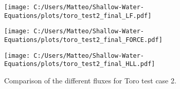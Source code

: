 \begin{figure}[H]
    \centering
    \begin{minipage}{0.45\textwidth}
        \centering
        \texttt{[image: C:/Users/Matteo/Shallow-Water-Equations/plots/toro\_test2\_final\_LF.pdf]}
    \end{minipage}%
    \hfill
    \begin{minipage}{0.45\textwidth}
        \centering
        \texttt{[image: C:/Users/Matteo/Shallow-Water-Equations/plots/toro\_test2\_final\_FORCE.pdf]}
    \end{minipage}
    
    \vspace{0.5cm} %
    \begin{minipage}{0.45\textwidth}
        \centering
        \texttt{[image: C:/Users/Matteo/Shallow-Water-Equations/plots/toro\_test2\_final\_HLL.pdf]}
    \end{minipage}
    \caption{Comparison of the different fluxes for Toro test case 2.}\label{fig:toro_test2_fluxes}
\end{figure}



